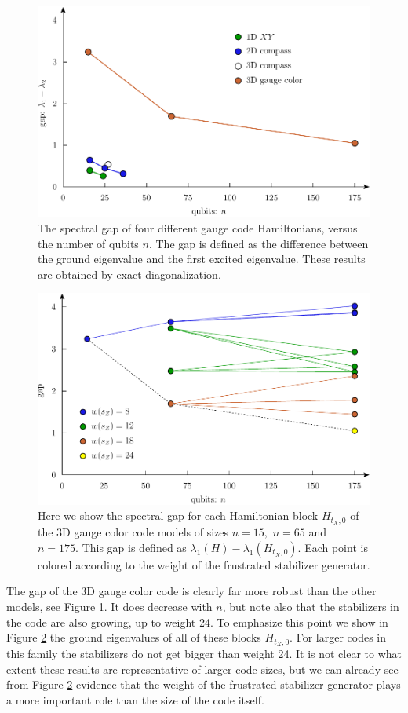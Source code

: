\documentclass[11pt,oneside]{article}
\begin{document}
\begin{figure}
\begin{center}
\includegraphics[width=0.8\columnwidth]{pic-gap.pdf}
\caption{The spectral gap of four different gauge code Hamiltonians, versus the number
of qubits $n$. The gap is defined as the difference between
the ground eigenvalue and the first excited eigenvalue.
These results are obtained by exact diagonalization.
}
\label{PicGap}
\end{center}
\end{figure}

\begin{figure}
\begin{center}
\includegraphics[width=0.8\columnwidth]{pic-gap-stabs.pdf}
\caption{
Here we show the spectral gap
for each Hamiltonian block $H_{t_X,0}$
of the 3D gauge color code models of sizes $n=15,$ $n=65$ and $n=175.$
This gap is defined as $\lambda_1(H) - \lambda_1(H_{t_X,0}).$
Each point is colored according to the weight of the
frustrated stabilizer generator.
}
\label{PicGapStabs}
\end{center}
\end{figure}

The gap of the 3D gauge color code is clearly far more
robust than the other models, see Figure \ref{PicGap}.
It does decrease with $n$, but note also that the
stabilizers in the code are also growing, up to weight 24.
To emphasize this point we show in Figure \ref{PicGapStabs}
the ground eigenvalues of all of these blocks $H_{t_X,0}.$
For larger codes in this family the stabilizers do not get
bigger than weight 24.
It is not clear to what extent these results are
representative of larger code sizes, but we
can already see from Figure \ref{PicGapStabs} 
evidence that 
the weight of the frustrated stabilizer generator plays a more
important role than the size of the code itself.
\end{document}

